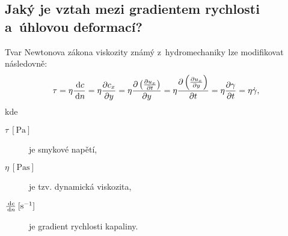 
\subsection{Jaký je vztah mezi gradientem rychlosti a~úhlovou deformací?}
Tvar Newtonova zákona viskozity známý z~hydromechaniky lze modifikovat následovně:
\begin{equation}
	\tau
	= \eta \frac{\,\mathrm{d} c}{\,\mathrm{d} n}
	= \eta \frac{\partial c_x}{\partial y}
	= \eta \frac{\partial \left(\frac{\partial u_x}{\partial t}\right)}{\partial y}
	= \eta \frac{\partial \left(\frac{\partial u_x}{\partial y}\right)}{\partial t}
	= \eta \frac{\partial \gamma}{\partial t}
	= \eta \dot{\gamma},
\end{equation}
kde
\begin{description}
	\item[{$\tau\:[\si{\pascal}]$}] je smykové napětí,
	\item[{$\eta\:[\si{\pascal\second}]$}] je tzv. dynamická viskozita,
	\item[{$\tfrac{\,\mathrm{d} c}{\,\mathrm{d} n}\:[\si{\per\second}]$}] je gradient rychlosti kapaliny.
\end{description}
